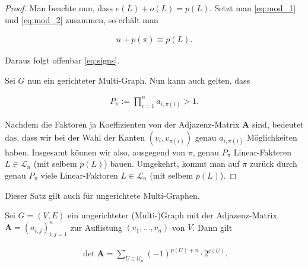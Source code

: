 \begin{proof}
                Man beachte nun, dass $e(L) + o(L) = p(L)$.
                Setzt man \eqref{eq:mod_1} und \eqref{eq:mod_2} zusammen, so erhält man

                \begin{align*}
                    n + p(\pi) \equiv p(L).
                \end{align*}

                Daraus folgt offenbar \eqref{eq:signs}.

                Sei $G$ nun ein gerichteter Multi-Graph.
                Nun kann auch gelten, dass

                \begin{align*}
                    P_\pi
                    :=
                    \prod_{i=1}^n a_{i, \pi(i)}
                    >
                    1.
                \end{align*}

                Nachdem die Faktoren ja Koeffizienten von der Adjazenz-Matrix $\mathbf A$ sind, bedeutet das, dass wir bei der Wahl der Kanten $(v_i, v_{\pi(i)})$ genau $a_{i, \pi(i)}$ Möglichkeiten haben.
                Insgesamt können wir also, ausgegend von $\pi$, genau $P_\pi$ Linear-Fakteren $L \in \mathcal L_n$ (mit selbem $p(L)$) bauen.
                Umgekehrt, kommt man auf $\pi$ zurück durch genau $P_\pi$ viele Linear-Faktoren $L \in \mathcal L_n$ (mit selbem $p(L)$).

            \end{proof}

            Dieser Satz gilt auch für ungerichtete Multi-Graphen.

            \begin{corollary} \label{cor:det}

                Sei $G = (V, E)$ ein ungerichteter (Multi-)Graph mit der Adjazenz-Matrix $\mathbf A = (a_{i,j})_{i,j=1}^n$ zur Auflistung $(v_1, \dots, v_n)$ von $V$.
                Dann gilt

                \begin{align} \label{eq:det_undirected}
                    \det \mathbf A
                    =
                    \sum_{U \in \mathcal U_n}
                        (-1)^{p(U) + n} \cdot 2^{c(U)}.
                \end{align}

            \end{corollary}

